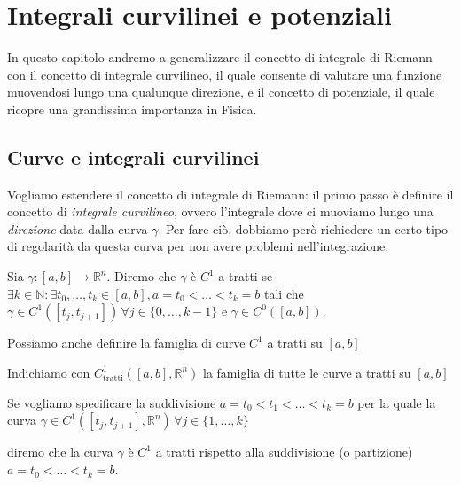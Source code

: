 \chapter{Integrali curvilinei e potenziali}
\pagestyle{plain}
\thispagestyle{empty}
\pagestyle{fancy}
In questo capitolo andremo a generalizzare il concetto di integrale di Riemann con il concetto di integrale curvilineo, il quale consente di valutare una funzione muovendosi lungo una qualunque direzione, e il concetto di potenziale, il quale ricopre una grandissima importanza in Fisica.
\label{cap:integrali_curvilinei}

\vspace{0.5cm}
\section{Curve e integrali curvilinei}

Vogliamo estendere il concetto di integrale di Riemann: il primo passo è definire il concetto di \emph{integrale curvilineo}, ovvero l'integrale dove ci muoviamo lungo una \emph{direzione} data dalla curva $\gamma$. Per fare ciò, dobbiamo però richiedere un certo tipo di regolarità da questa curva per non avere problemi nell'integrazione.

\vspace{0.5cm}
\begin{definition}[\textcolor{blue}{curva $C^1$ a tratti}]
	Sia $\gamma: [a, b] \to \mathbb{R}^n$. Diremo che $\gamma$ è $C^1$ a tratti se $\exists k \in \mathbb{N} : \exists t_0, \ldots, t_k \in [a, b], a = t_0 < \ldots < t_k = b$ tali che $\gamma \in C^1([t_{j}, t_{j+1}]) \, \forall j \in \{0, \ldots, k-1 \}$ e $\gamma \in C^0([a, b])$.
\end{definition}

Possiamo anche definire la famiglia di curve $C^1$ a tratti su $[a,b]$

\vspace{0.5cm}
\begin{definition}[\textcolor{blue}{famiglie delle curve $C^1$ a tratti}]
	Indichiamo con $C^1_{\text{tratti}}([a, b], \mathbb{R}^n)$ la famiglia di tutte le curve a tratti su $[a, b]$
\end{definition}

Se vogliamo specificare la suddivisione $a=t_0 < t_1 < \ldots < t_k = b$ per la quale la curva $\gamma \in C^1([t_j, t_{j+1}], \mathbb{R}^n) \, \forall j \in \{1, \ldots, k \}$ 

diremo che la curva $\gamma$ è $C^1$ a tratti rispetto alla suddivisione (o partizione) $a = t_0 < \ldots < t_k = b$. \\

